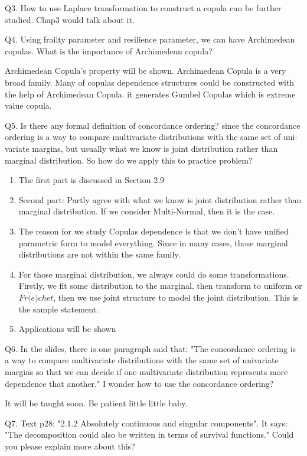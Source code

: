 \documentclass[a4paper,12pt]{texMemo}
\begin{document}
Q3. How to use Laplace transformation to construct a copula can be further studied. Chap3 would talk about it.

Q4. Using frailty parameter and resilience parameter, we can have Archimedean copulas. What is the importance of Archimedean copula?

Archimedean Copula's property will be shown. Archimedean Copula is a very broad family. Many of copulas dependence structures could be constructed with the help of Archimedean Copula. it generates Gumbel Copulas which is extreme value copula.

Q5. Is there any formal definition of concordance ordering? since the concordance ordering is a way to compare multivariate distributions with the same set of uni-variate margins, but usually what we know is joint distribution rather than marginal distribution. So how do we apply this to practice problem?

\begin{enumerate}
\item The first part is discussed in Section 2.9
\item Second part: Partly agree with what we know is joint distribution rather than marginal distribution. If we consider Multi-Normal, then it is the case. 
\item The reason for we study Copulas dependence is that we don't have unified parametric form to model everything. Since in many cases, those marginal distributions are not within the same family. 
\item For those marginal distribution, we always could do some transformations. Firstly, we fit some distribution to the marginal, then transform to uniform or $Fr\acute(e)chet$, then we use joint structure to model the joint distribution. This is the sample statement.
\item Applications will be shown
\end{enumerate}

Q6. In the slides, there is one paragraph said that: 
"The concordance ordering is a way to compare multivariate distributions with the same set of univariate margins so that we can decide if one multivariate distribution represents more dependence that another."
I wonder how to use the concordance ordering?

It will be taught soon. Be patient little little baby.

Q7. Text p28: "2.1.2 Absolutely continuous and singular components". It says: "The decomposition could also be written in terms of survival functions." Could you please explain more about this?
\end{document}
